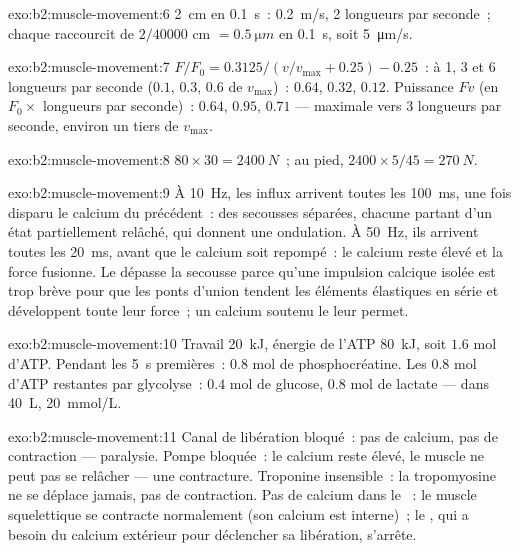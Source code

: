 \begin{solution}{exo:b2:muscle-movement:6}
\qty{2}{cm} en \qty{0.1}{s}~: \qty{0.2}{m/s}, 2 longueurs par seconde~;
chaque  raccourcit de $2/\num{40000}$ cm $= \qty{0.5}{\micro m}$ en
\qty{0.1}{s}, soit \qty{5}{\micro m/s}.
\end{solution}

\begin{solution}{exo:b2:muscle-movement:7}
$F/F_0 = 0.3125/(v/v_{\max} + 0.25) - 0.25$~: à 1, 3 et 6 longueurs par
seconde ($0.1$, $0.3$, $0.6$ de $v_{\max}$)~: $0.64$, $0.32$, $0.12$.
Puissance $Fv$ (en $F_0\times$ longueurs par seconde)~: $0.64$, $0.95$, $0.71$
--- maximale vers 3 longueurs par seconde, environ un tiers de $v_{\max}$.
\end{solution}

\begin{solution}{exo:b2:muscle-movement:8}
$80\times 30 = \qty{2400}{N}$~; au pied, $2400\times 5/45 =
\qty{270}{N}$.
\end{solution}

\begin{solution}{exo:b2:muscle-movement:9}
À \qty{10}{Hz}, les influx arrivent toutes les \qty{100}{ms}, une fois
disparu le calcium du précédent~: des secousses séparées, chacune partant
d'un état partiellement relâché, qui donnent une ondulation. À
\qty{50}{Hz}, ils arrivent toutes les \qty{20}{ms}, avant que le calcium
soit repompé~: le calcium reste élevé et la force fusionne. Le
 dépasse la secousse parce qu'une impulsion calcique isolée est
trop brève pour que les ponts d'union tendent les éléments élastiques en
série et développent toute leur force~; un calcium soutenu le leur permet.
\end{solution}

\begin{solution}{exo:b2:muscle-movement:10}
Travail \qty{20}{kJ}, énergie de l'ATP \qty{80}{kJ}, soit $1.6$ mol
d'ATP. Pendant les \qty{5}{s} premières~: $0.8$ mol de phosphocréatine.
Les $0.8$ mol d'ATP restantes par glycolyse~: $0.4$ mol de glucose,
$0.8$ mol de lactate --- dans \qty{40}{L}, \qty{20}{mmol/L}.
\end{solution}

\begin{solution}{exo:b2:muscle-movement:11}
Canal de libération bloqué~: pas de calcium, pas de contraction ---
paralysie. Pompe bloquée~: le calcium reste élevé, le muscle ne peut pas
se relâcher --- une contracture. Troponine insensible~: la tropomyosine
ne se déplace jamais, pas de contraction. Pas de calcium dans le ~: le
muscle squelettique se contracte normalement (son calcium est interne)~;
le , qui a besoin du calcium extérieur pour déclencher sa libération,
s'arrête.
\end{solution}

